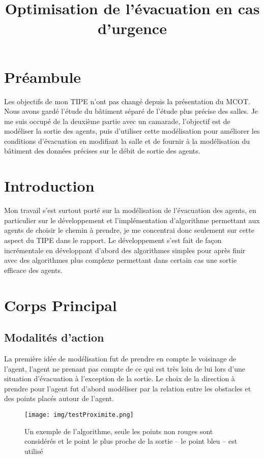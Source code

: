 \documentclass{article}
\title{Optimisation de l'évacuation en cas d'urgence}
\begin{document}
\maketitle

\section{Préambule}

Les objectifs de mon TIPE n'ont pas changé depuis la présentation du MCOT.
Nous avons gardé l'étude du bâtiment séparé de l'étude plus précise des salles.
Je me suis occupé de la deuxième partie avec un camarade, l'objectif est de
modéliser la sortie des agents, puis d'utiliser cette modélisation
pour améliorer les conditions d'évacuation en modifiant la salle et de
fournir à la modélisation du bâtiment des données précises sur le débit
de sortie des agents.

\section{Introduction}

Mon travail s'est surtout porté sur la modélisation de l'évacuation des
agents, en particulier sur le développement et l'implémentation
d'algorithme permettant aux agents de choisir le chemin à prendre, je
me concentrai donc seulement sur cette aspect du TIPE dans le rapport.
Le développement s'est fait de façon incrémentale en développant d'abord
des algorithmes simples pour après finir avec des algorithmes plus complexe
permettant dans certain cas une sortie efficace des agents.

\section{Corps Principal}

\subsection{Modalités d'action}

La première idée de modélisation fut de prendre en compte le voisinage de l'agent, l'agent ne prenant pas compte de ce qui est très loin de lui lors d'une situation
d'évacuation à l'exception de la sortie. Le choix de la direction à prendre pour
l'agent fut d'abord modéliser par la relation
entre les obstacles et des points placés autour de l'agent.

\begin{figure}[h]
  \centering
  \texttt{[image: img/testProximite.png]}
  \caption{Un exemple de l'algorithme, seule les points non rouges sont considérés
    et le point le plus proche de la sortie -- le point bleu -- est utilisé}
\end{figure}
\end{document}
